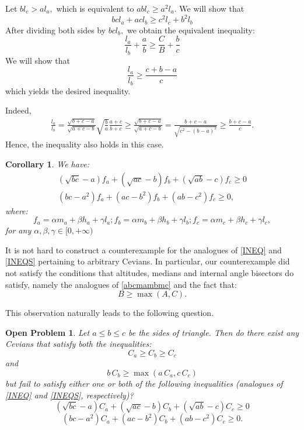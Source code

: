 \documentclass[a4paper,12pt]{article}
\newtheorem{corollary}{Corollary}
\newtheorem{openproblem}{Open Problem}
\begin{document}
Let $bl_c > a l_a ,$ which is equivalent to $ab l_c \geq a^2 l_a.$ 
We will show that 
\[
bcl_a+acl_b \geq c^2l_c+b^2l_b
\]
After dividing both sides by $bcl_b,$ we obtain the equivalent inequality:
\[
\frac{l_a}{l_b}+\frac{a}{b} \geq \frac{C}{B}+\frac{b}{c}
\]
We will show that
\[
\frac{l_a}{l_b} \geq \frac{c+b-a}{c}
\]
which yields the desired inequality.

Indeed,
\begin{align*}
\frac{l_a}{l_b}= \frac{\sqrt{ b+c-a} }{\sqrt{ a+c-b} } \sqrt{\frac{b}{a}}\frac{a+c}{b+c} \geq \frac{\sqrt{ b+c-a} }{\sqrt{ a+c-b} }  = \frac{ b+c-a}{\sqrt{c^2-(b-a)^2}} \geq \frac{ b+c-a}{c} .
\end{align*}
Hence, the inequality also holds in this case.


\begin{corollary} We have:
\begin{align}
(\sqrt{bc}-a) f_a+(\sqrt{ac}-b) f_b+(\sqrt{ab}-c)  f_c \geq 0\\
(bc-a^2) f_a+(ac-b^2) f_b+(ab-c^2)  f_c \geq 0,
\end{align}
where:
\[
f_a=\alpha m_a+ \beta h_a + \gamma l_a; f_b=\alpha m_b+ \beta h_b + \gamma l_b ; f_c=\alpha m_c+ \beta h_c + \gamma l_c,
\]
for any $\alpha, \beta, \gamma \in [0,+\infty)$
\end{corollary}

It is not hard to construct a counterexample for the analogues of \eqref{INEQ} and \eqref{INEQS} pertaining to arbitrary Cevians. In particular, our counterexample did not satisfy the conditions that altitudes, medians and internal angle bisectors do satisfy, namely the analogues of \eqref{abcmambmc} and the fact that:
\[
B \geq \max(A, C).
\]

This observation naturally leads to the following question.
\begin{openproblem} Let $a \leq b \leq c$ be the sides of triangle. Then do there exist any Cevians  that satisfy both the inequalities:
\begin{equation}\label{eqcacabcc}
C_a \geq C_b \geq C_c
\end{equation}
and
\begin{equation}\label{BmaxAC}
b\, C_b \geq \max(a\, C_a, c\, C_c)
\end{equation}
but fail to satisfy either one or both of the following inequalities (analogues of \eqref{INEQ} and \eqref{INEQS}, respectively)?
\begin{equation*}
(\sqrt{bc}-a) C_a+(\sqrt{ac}-b) C_b+(\sqrt{ab}-c)  C_c \geq 0\tag{1$^*$} \label{EQ1prim}
\end{equation*}
\begin{equation*}
(bc-a^2) C_a+(ac-b^2) C_b+(ab-c^2)  C_c \geq 0.
\tag{2$^*$} \label{EQ2prim}
\end{equation*}
\end{openproblem}
\end{document}
